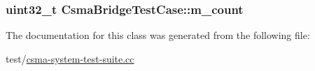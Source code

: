 \subsubsection[{\texorpdfstring{m\+\_\+count}{m_count}}]{\setlength{\rightskip}{0pt plus 5cm}uint32\+\_\+t Csma\+Bridge\+Test\+Case\+::m\+\_\+count\hspace{0.3cm}{\ttfamily [private]}}\hypertarget{classCsmaBridgeTestCase_a635c9dbf3859a6b4f6097aa996548006}{}\label{classCsmaBridgeTestCase_a635c9dbf3859a6b4f6097aa996548006}


The documentation for this class was generated from the following file\+:\begin{DoxyCompactItemize}
\item 
test/\hyperlink{csma-system-test-suite_8cc}{csma-\/system-\/test-\/suite.\+cc}\end{DoxyCompactItemize}

